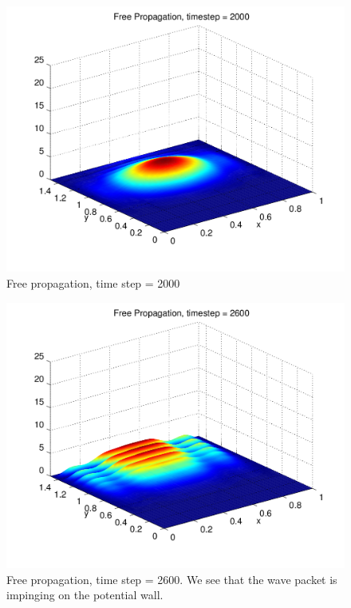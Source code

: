 \documentclass[letterpaper,12pt]{article}
\begin{document}
\begin{figure}[!htbp]
\centering
\includegraphics[scale=0.55,trim = 2mm 12mm 12mm 2mm,clip=true]{prop3.png}
\caption{Free propagation, time step = 2000}
\label{fig:p3}
\end{figure}

\begin{figure}[!htbp]
\centering
\includegraphics[scale=0.55,trim = 2mm 12mm 12mm 2mm,clip=true]{prop4.png}
\caption{Free propagation, time step = 2600. We see that the wave packet is impinging on the potential wall.}
\label{fig:p3}
\end{figure}
\end{document}
